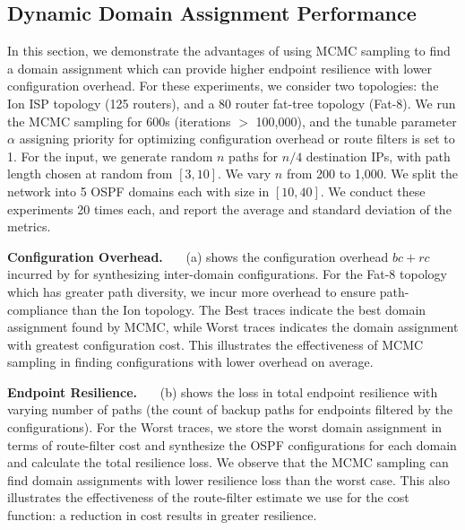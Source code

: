 \subsection{Dynamic Domain Assignment Performance} \label{sec:mcmceval}
In this section, we demonstrate the advantages of using MCMC sampling
to find a domain assignment which can provide higher endpoint
resilience with lower configuration overhead. For these experiments,
we consider two topologies: the Ion ISP topology (125 routers), and a
80 router fat-tree topology (Fat-8). We run the MCMC sampling for 600s
(iterations $>$ 100,000), and the tunable parameter $\alpha$ assigning
priority for optimizing configuration overhead or route filters is set
to 1. For the input, we generate random $n$ paths for $n/4$
destination IPs, with path length chosen at random from $[3,10]$. 
We vary $n$ from 200 to 1,000.
We
split the network into 5 OSPF domains each with size in $[10,40]$. We
conduct these experiments 20 times each, and report the average and
standard deviation of the metrics.

\noindent\textbf{Configuration Overhead.}~~~
(a) shows the configuration overhead $bc + rc$ 
incurred by \name for synthesizing inter-domain configurations.
For the Fat-8 topology which has greater path diversity, we incur more 
overhead to ensure path-compliance than the Ion topology. 
The Best traces indicate the best domain assignment found by MCMC, while 
Worst traces indicates the domain assignment with greatest 
configuration cost. 
This illustrates
the effectiveness of MCMC sampling in finding configurations with lower overhead on average.

\noindent\textbf{Endpoint Resilience.}~~~ (b) shows
the loss in total endpoint resilience with varying number of paths
(the count of backup paths for endpoints filtered by the
configurations). For the Worst traces, we store the worst domain
assignment in terms of route-filter cost and synthesize the OSPF
configurations for each domain and calculate the total resilience
loss. We observe that the MCMC sampling can find domain assignments
with lower resilience loss than the worst case. This also illustrates
the effectiveness of the route-filter estimate we use for the cost
function: a reduction in cost results in greater resilience.

